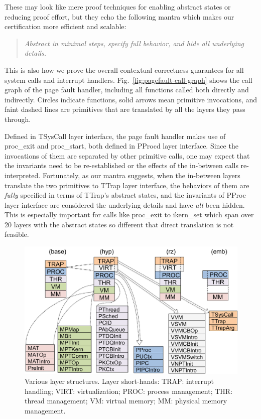 These may look like mere proof techniques for enabling abstract states
or reducing proof effort, but they echo the following mantra which 
makes our certification more efficient and scalable:
\begin{quote}
\emph{Abstract in minimal steps, specify \emph{full} behavior,
and hide \emph{all} underlying details.}
\end{quote}
This is also how we prove the overall contextual correctness
guarantees for all system calls and interrupt handlers.
Fig.~\ref{fig:pagefault-call-graph} shows the call graph of the page
fault handler, including all functions called both directly and
indirectly.  Circles indicate functions, solid arrows mean primitive
invocations, and faint dashed lines are primitives that are translated
by all the layers they pass through.

Defined in \textsf{TSysCall} layer interface, the page fault handler makes use of
\textsf{proc\_exit} and \textsf{proc\_start}, both defined in \textsf{PProc}d layer interface.
Since the invocations of them are separated by other primitive calls,
one may expect that the invariants need to be re-established or
the effects of the in-between calls re-interpreted.
Fortunately, as our mantra suggests, when the in-between layers translate
the two primitives to \textsf{TTrap} layer interface, the behaviors of them are
\emph{fully} specified in terms of \textsf{TTrap}'s abstract states,
and the invariants of \textsf{PProc} layer interface are considered the underlying
details and have \emph{all} been hidden.
This is especially important for calls like \textsf{proc\_exit} to
\textsf{ikern\_set} which span over 20 layers with the abstract states
so different that direct translation is not feasible.

\begin{figure}[t]
\center
\includegraphics[scale=0.31]{figs/layers2} 
\caption{Various \mCTOS{} layer structures.
Layer short-hands: TRAP: interrupt handling; VIRT: virtualization;
PROC: process management; THR: thread management;
VM: virtual memory; MM: physical memory management.}
\label{fig:kernel-layers}
\end{figure}

